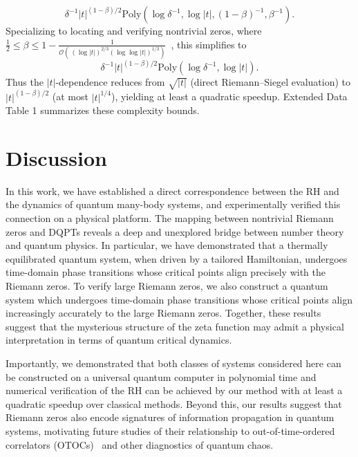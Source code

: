 \documentclass[aps,pra,twocolumn,superscriptaddress,preprintnumbers,amsmath,amssymb]{revtex4-2}
\begin{document}
\begin{equation}
    \delta^{-1}|t|^{(1-\beta)/2}
    \mathrm{Poly}(\log \delta^{-1},\log |t|,(1-\beta)^{-1},\beta^{-1}).
\end{equation}
Specializing to locating and verifying nontrivial zeros, where $ \tfrac{1}{2}\leq \beta \leq 1-\frac{1}{\mathcal{O} (\, (\log |t|)^{2/3} (\log \log |t|)^{1/3})}$~\cite{mossinghoff2024explicit}, this simplifies to
\begin{equation}
    \delta^{-1}|t|^{(1-\beta)/2}
    \mathrm{Poly}(\log \delta^{-1},\log |t|).
\end{equation} 
Thus the $|t|$-dependence reduces from $\sqrt{|t|}$ (direct Riemann–Siegel evaluation) to $|t|^{(1-\beta)/2}$ (at most $|t|^{1/4}$), yielding at least a quadratic speedup. Extended Data Table 1 summarizes these complexity bounds.


\section{Discussion}\label{dis}
In this work, we have established a direct correspondence between the RH and the dynamics of quantum many-body systems, and experimentally verified this connection on a physical platform. The mapping between nontrivial Riemann zeros and DQPTs reveals a deep and unexplored bridge between number theory and quantum physics. In particular, we have demonstrated that a thermally equilibrated quantum system, when driven by a tailored Hamiltonian, undergoes time-domain phase transitions whose critical points align precisely with the Riemann zeros. To verify large Riemann zeros, we also construct a quantum system  which undergoes time-domain phase transitions whose critical points align increasingly accurately to the large Riemann zeros.  
Together, these results suggest that the mysterious structure of the zeta function may admit a physical interpretation in terms of quantum critical dynamics.


Importantly, we demonstrated that both classes of systems considered here can be constructed on a universal quantum computer in polynomial time and  numerical verification of the RH can be achieved by our method with at least a quadratic speedup over classical methods. Beyond this, our results suggest that Riemann zeros also encode signatures of information propagation in quantum systems, motivating future studies of their relationship to out-of-time-ordered correlators (OTOCs)~\cite{garttner2017measuring,braumuller2022probing,google2025observation} and other diagnostics of quantum chaos. 
\end{document}
